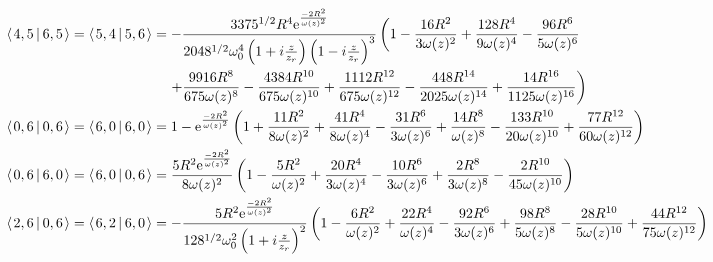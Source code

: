 \documentclass[11pt]{amsart}
\makeatletter
\newcommand{\e}{{\rm e}}				%
\newcommand{\msp}[1]{\mspace{#1mu}}		%
\newcommand{\0}{\varnothing}		%
\newcommand{\brac}[2]{\left\langle\msp{2} #1\left\lvert \msp{3.5} #2 \right.\right\rangle}	%
\newcommand{\1}{!}
\newcommand{\2}{@}
\newcommand{\3}{\#}
\newcommand{\4}{\$}
\newcommand{\5}{\%}
\newcommand{\6}{$^\wedge$}
\newcommand{\7}{\&}
\newcommand{\8}{*}
\newcommand{\9}{(}
\makeatother
\begin{document}
\begin{align*}
\\
&
\brac{4,5}{6,5} = \brac{5,4}{5,6} = -\frac{3375^{1/2}R^4\e^{\frac{-2R^2}{\omega(z)^2}}}{2048^{1/2}\omega_0^4\left(1+i\frac{z}{z_r}\right)\left(1-i\frac{z}{z_r}\right)^3}\left(1-\frac{16R^2}{3\omega(z)^2}+\frac{128R^4}{9\omega(z)^4}-\frac{96R^6}{5\omega(z)^6}\right.
\\
&
\msp{210}\left.+\frac{9916R^8}{675\omega(z)^8}-\frac{4384R^{10}}{675\omega(z)^{10}}+\frac{1112R^{12}}{675\omega(z)^{12}}-\frac{448R^{14}}{2025\omega(z)^{14}}+\frac{14R^{16}}{1125\omega(z)^{16}}\right)
\\
&
\brac{0,6}{0,6} = \brac{6,0}{6,0} = 1-\e^{\frac{-2R^2}{\omega(z)^2}}\left(1+\frac{11R^2}{8\omega(z)^2}+\frac{41R^4}{8\omega(z)^4}-\frac{31R^6}{3\omega(z)^6}+\frac{14R^8}{\omega(z)^8}-\frac{133R^{10}}{20\omega(z)^{10}}+\frac{77R^{12}}{60\omega(z)^{12}}\right)
\\
&
\brac{0,6}{6,0} = \brac{6,0}{0,6} = \frac{5R^2\e^{\frac{-2R^2}{\omega(z)^2}}}{8\omega(z)^2}\left(1-\frac{5R^2}{\omega(z)^2}+\frac{20R^4}{3\omega(z)^4}-\frac{10R^6}{3\omega(z)^6}+\frac{2R^8}{3\omega(z)^8}-\frac{2R^{10}}{45\omega(z)^{10}}\right)
\\
&
\brac{2,6}{0,6} = \brac{6,2}{6,0}= -\frac{5R^2\e^{\frac{-2R^2}{\omega(z)^2}}}{128^{1/2}\omega_0^2\left(1+i\frac{z}{z_r}\right)^2}\left(1-\frac{6R^2}{\omega(z)^2}+\frac{22R^4}{\omega(z)^4}-\frac{92R^6}{3\omega(z)^6}+\frac{98R^8}{5\omega(z)^8}-\frac{28R^{10}}{5\omega(z)^{10}}+\frac{44R^{12}}{75\omega(z)^{12}}\right)
\end{align*}
\end{document}
